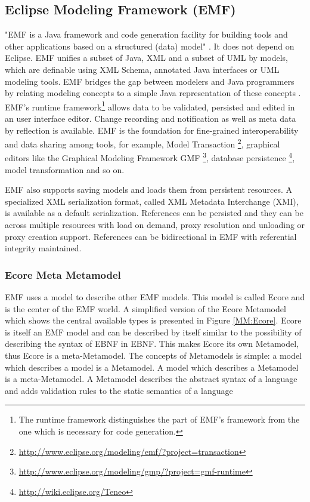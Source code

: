 \subsection{Eclipse Modeling Framework (EMF) }
"EMF is a Java framework and code generation facility for building tools and other applications based on a structured (data) model" \cite{EMFDoc}. 
It does not depend on Eclipse. EMF unifies a subset of Java, XML and a subset of UML by models, which are definable using XML Schema, annotated Java interfaces or UML modeling tools. EMF bridges the gap between modelers and Java programmers by relating modeling concepts to a simple Java representation of these concepts \cite{EMF2nd}.\\

EMF's runtime framework\footnote{\raggedright The runtime framework distinguishes the part of EMF's framework from the one which is necessary for code generation.} allows data to be validated, persisted and edited in an user interface editor. Change recording and notification as well as meta data by reflection is available. EMF is the foundation for fine-grained interoperability and data sharing among tools, for example, Model Transaction \footnote{\raggedright \url{http://www.eclipse.org/modeling/emf/?project=transaction}}, graphical editors like the Graphical Modeling Framework GMF \footnote{\raggedright \url{http://www.eclipse.org/modeling/gmp/?project=gmf-runtime}}, database persistence \footnote{\raggedright \url{http://wiki.eclipse.org/Teneo}}, model transformation and so on.

EMF also supports saving models and loads them from persistent resources. A specialized XML serialization format, called XML Metadata Interchange (XMI), is available as a default serialization. References can be persisted and they can be across multiple resources with load on demand, proxy resolution and unloading or proxy creation support. References can be bidirectional in EMF with referential integrity maintained. \cite{EMF2nd}\\

\subsubsection{Ecore Meta Metamodel} \label{ecore}
EMF uses a model to describe other EMF models. This model is called Ecore and is the center of the EMF world. A simplified version of the Ecore Metamodel which shows the central available types is presented in Figure \ref{MM:Ecore}. Ecore is itself an EMF model and can be described by itself similar to the possibility of describing the syntax of EBNF in EBNF. This makes Ecore its own Metamodel, thus Ecore is a meta-Metamodel. The concepts of Metamodels is simple: a model which describes a model is a Metamodel. A model which describes a Metamodel is a meta-Metamodel. \cite{EMF2nd}  A Metamodel describes the abstract syntax of a language \cite{EMP} and adds validation rules to the static semantics of a language \cite{MDSD}

